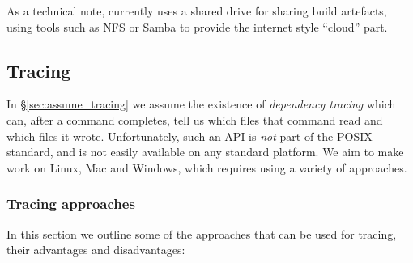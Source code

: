As a technical note, currently \Rattle uses a shared drive for sharing build artefacts, using tools such as NFS or Samba to provide the internet style ``cloud'' part.


\subsection{Tracing}
\label{sec:tracing}

In \S\ref{sec:assume_tracing} we assume the existence of \emph{dependency tracing} which can, after a command completes, tell us which files that command read and which files it wrote. Unfortunately, such an API is \emph{not} part of the POSIX standard, and is not easily available on any standard platform. We aim to make \Rattle work on Linux, Mac and Windows, which requires using a variety of approaches.

\subsubsection{Tracing approaches}

In this section we outline some of the approaches that can be used for tracing, their advantages and disadvantages:


